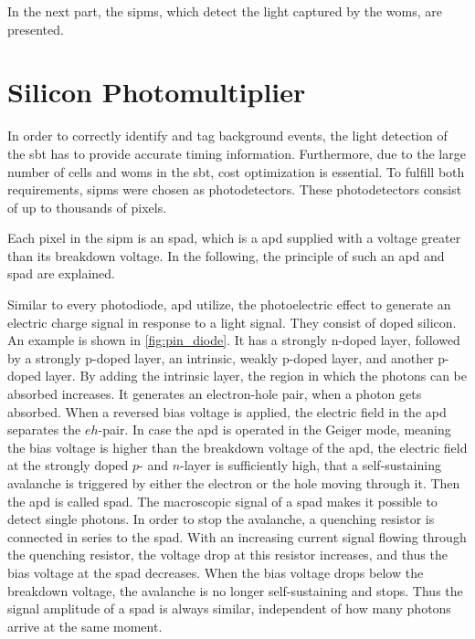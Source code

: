 In the next part, the \acp{sipm}, which detect the light captured by the \acp{wom}, are presented.


\section{Silicon Photomultiplier}
In order to correctly identify and tag background events, the light detection of the \ac{sbt} has to provide accurate timing information.
Furthermore, due to the large number of cells and \acp{wom} in the \ac{sbt}, cost optimization is essential.
To fulfill both requirements, \acp{sipm} were chosen as photodetectors.
These photodetectors consist of up to thousands of pixels.

Each pixel in the \ac{sipm} is an \ac{spad}, which is a \ac{apd} supplied with a voltage greater than its breakdown voltage.
In the following, the principle of such an \ac{apd} and \ac{spad} are explained.

Similar to every photodiode, \ac{apd} utilize, the photoelectric effect to generate an electric charge signal in response to a light signal.
They consist of doped silicon.
An example is shown in \autoref{fig:pin_diode}.
It has a strongly n-doped layer, followed by a strongly p-doped layer, an intrinsic, weakly p-doped layer, and another p-doped layer.
By adding the intrinsic layer, the region in which the photons can be absorbed increases.
It generates an electron-hole pair, when a photon gets absorbed.
When a reversed bias voltage is applied, the electric field in the \ac{apd} separates the $eh$-pair.
In case the \ac{apd} is operated in the Geiger mode, meaning the bias voltage is higher than the breakdown voltage of the \ac{apd}, the electric field at the strongly doped $p$- and $n$-layer is sufficiently high, that a self-sustaining avalanche is triggered by either the electron or the hole moving through it.
Then the \ac{apd} is called \ac{spad}.
The macroscopic signal of a \ac{spad} makes it possible to detect single photons.
In order to stop the avalanche, a quenching resistor is connected in series to the \ac{spad}.
With an increasing current signal flowing through the quenching resistor, the voltage drop at this resistor increases, and thus the bias voltage at the \ac{spad} decreases.
When the bias voltage drops below the breakdown voltage, the avalanche is no longer self-sustaining and stops.
Thus the signal amplitude of a \ac{spad} is always similar, independent of how many photons arrive at the same moment.


